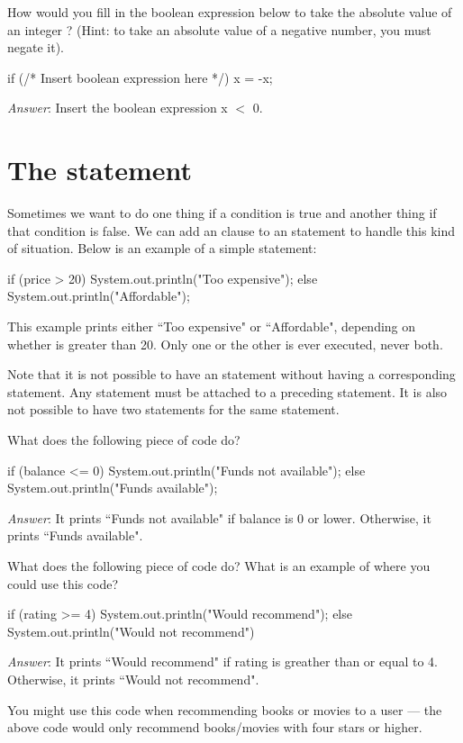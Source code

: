 \begin{example}
How would you fill in the boolean expression below to take the absolute value of an integer ? (Hint: to take an absolute value of a negative number, you must negate it).

\begin{code}
if (/* Insert boolean expression here */) {
    x = -x;
} 
\end{code}

\emph{Answer}: Insert the boolean expression x $<$ 0.
\end{example}

\section{The  statement}
Sometimes we want to do one thing if a condition is true and another thing if that condition is false. We can add an  clause to an  statement to handle this kind of situation. Below is an example of a simple  statement:

\begin{code}
if (price > 20) {
    System.out.println("Too expensive");
} else {
    System.out.println("Affordable");
}
\end{code}

\noindent This example prints either ``Too expensive" or ``Affordable", depending on whether  is greater than 20. Only one or the other is ever executed, never both.

Note that it is not possible to have an  statement without having a corresponding  statement. Any  statement must be attached to a preceding  statement. It is also not possible to have two  statements for the same  statement.

\begin{example}
What does the following piece of code do?

\begin{code}
if (balance <= 0) {
    System.out.println("Funds not available");
} else {
    System.out.println("Funds available");
}
\end{code}

\emph{Answer}: It prints ``Funds not available" if balance is 0 or lower. Otherwise, it prints ``Funds available".
\end{example}

\begin{example}
What does the following piece of code do? What is an example of where you could use this code?

\begin{code}
if (rating >= 4) {
    System.out.println("Would recommend");
} else {
    System.out.println("Would not recommend")
}
\end{code}

\emph{Answer}: It prints ``Would recommend" if rating is greather than or equal to 4. Otherwise, it prints ``Would not recommend".

You might use this code when recommending books or movies to a user --- the above code would only recommend books/movies with four stars or higher.
\end{example}

